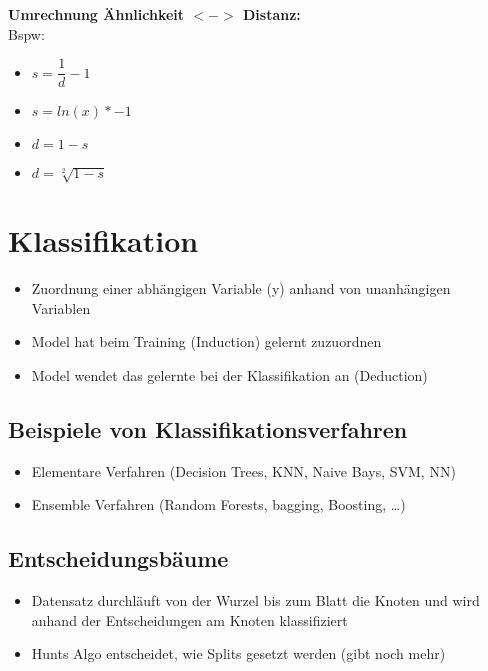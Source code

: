 \documentclass[a4paper]{article}
\begin{document}
\begin{landscape}
\begin{multicols}{3}
            \textbf{Umrechnung Ähnlichkeit $<->$ Distanz:}\\
            Bspw:
            \begin{itemize}[noitemsep,nolistsep]
                \item $s = \dfrac{1}{d}-1$
                \item $s = ln(x)*-1$
                \item $d = 1 - s$
                \item $d = \sqrt[2]{1-s}$
            \end{itemize}

    \section{Klassifikation}
            \begin{itemize}[noitemsep,nolistsep]
                \item Zuordnung einer abhängigen Variable (y) anhand von unanhängigen Variablen
                \item Model hat beim Training (Induction) gelernt zuzuordnen
                \item Model wendet das gelernte bei der Klassifikation an (Deduction)
            \end{itemize}
        \subsection{Beispiele von Klassifikationsverfahren}
        \begin{itemize}[noitemsep,nolistsep]
            \item Elementare Verfahren (Decision Trees, KNN, Naive Bays, SVM, NN)
            \item Ensemble Verfahren (Random Forests, bagging, Boosting, \dots)
        \end{itemize}
        \subsection{Entscheidungsbäume}
        \begin{itemize}[noitemsep,nolistsep]
            \item Datensatz durchläuft von der Wurzel bis zum Blatt die Knoten und wird anhand der Entscheidungen am Knoten klassifiziert
            \item Hunts Algo entscheidet, wie Splits gesetzt werden (gibt noch mehr)
        \end{itemize}

\end{multicols}
\end{landscape}
\end{document}
